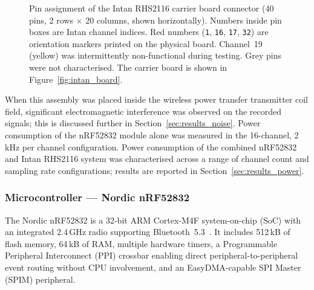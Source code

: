 \begin{figure}[htbp]
\caption{Pin assignment of the Intan RHS2116 carrier board connector (40 pins,
2 rows $\times$ 20 columns, shown horizontally). Numbers inside pin boxes are
Intan channel indices. Red numbers (\texttt{1}, \texttt{16}, \texttt{17},
\texttt{32}) are orientation markers printed on the physical board.
Channel~19 (yellow) was intermittently non-functional during testing.
Grey pins were not characterised. The carrier board is shown in
Figure~\ref{fig:intan_board}.}
\label{fig:connector_pinout}
\end{figure}

When this
assembly was placed inside the wireless power transfer transmitter coil field, significant
electromagnetic interference was observed on the recorded signals; this is discussed
further in Section~\ref{sec:results_noise}. %
Power consumption of the nRF52832 module alone was measured in the 16-channel,
2\,kHz per channel configuration. Power consumption of the combined nRF52832 and
Intan RHS2116 system was characterised across a range of channel count and
sampling rate configurations; results are reported in
Section~\ref{sec:results_power}.

\subsubsection{Microcontroller --- Nordic nRF52832}
The Nordic nRF52832 is a 32-bit ARM Cortex-M4F system-on-chip (SoC) with an
integrated 2.4\,GHz radio supporting Bluetooth~5.3~\cite{nordic_nrf52832_pb}.
It includes 512\,kB of flash memory, 64\,kB of RAM, multiple hardware timers,
a Programmable Peripheral Interconnect (PPI) crossbar enabling direct
peripheral-to-peripheral event routing without CPU involvement, and an
EasyDMA-capable SPI Master (SPIM) peripheral.


